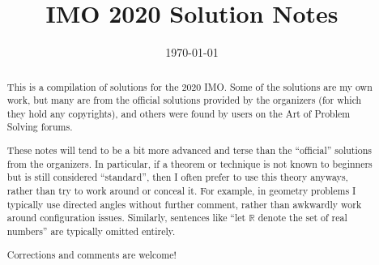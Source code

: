 \documentclass[11pt]{scrartcl}
\title{IMO 2020 Solution Notes}
\date{\today}
\begin{document}
\maketitle

\begin{abstract}
This is a compilation of solutions
for the 2020 IMO.
Some of the solutions are my own work,
but many are from the official solutions provided by the organizers
(for which they hold any copyrights),
and others were found by users on the Art of Problem Solving forums.

These notes will tend to be a bit more advanced and terse than the ``official''
solutions from the organizers.
In particular, if a theorem or technique is not known to beginners
but is still considered ``standard'', then I often prefer to
use this theory anyways, rather than try to work around or conceal it.
For example, in geometry problems I typically use directed angles
without further comment, rather than awkwardly work around configuration issues.
Similarly, sentences like ``let $\mathbb{R}$ denote the set of real numbers''
are typically omitted entirely.

Corrections and comments are welcome!
\end{abstract}

\tableofcontents
\newpage

\addtocounter{section}{-1}
\end{document}
